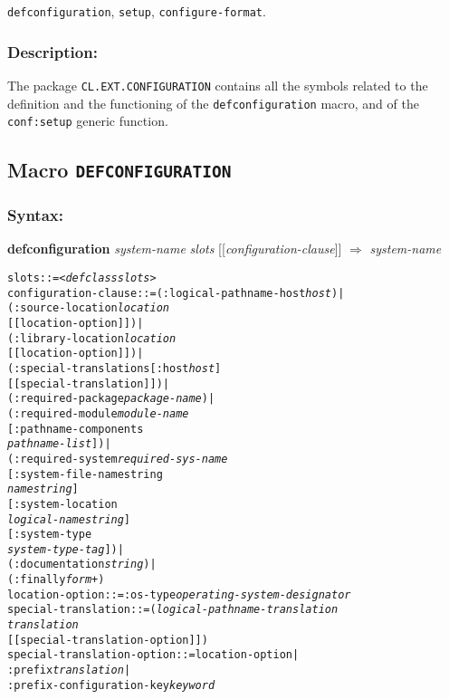 \documentclass[a4paper]{article}
\newcommand{\DEFCONFIGURATION}{\texttt{DEFCONFIGURATION}}
\newcommand{\defconfiguration}{\texttt{defconfiguration}}
\newcommand{\code}[1]{\texttt{#1}}
\begin{document}
\code{defconfiguration}, \code{setup}, \code{configure-format}.

\subsubsection*{Description:}

The package \code{CL.EXT.CONFIGURATION} contains all the symbols
related to the definition and the functioning of the
\defconfiguration{} macro, and of the \code{conf:setup} generic
function.

\subsection*{Macro \DEFCONFIGURATION{}}

\subsubsection*{Syntax:}

\textbf{defconfiguration} \emph{system-name} \emph{slots}
[[\emph{configuration-clause}]] $\Rightarrow$ \emph{system-name}

\begin{alltt}
slots ::= \emph{<defclass slots>}
configuration-clause ::= (:logical-pathname-host \emph{host}) |
                         (:source-location \emph{location}
                                           [[location-option]]) |
                         (:library-location \emph{location}
                                            [[location-option]]) |
                         (:special-translations [:host \emph{host}]
                                                [[special-translation]]) |
                         (:required-package \emph{package-name}) |
                         (:required-module \emph{module-name}
                                           [:pathname-components
                                            \emph{pathname-list}]) |
                         (:required-system \emph{required-sys-name}
                                           [:system-file-namestring
                                            \emph{namestring}]
                                           [:system-location
                                            \emph{logical-namestring}]
                                           [:system-type
                                            \emph{system-type-tag}]) |
                         (:documentation \emph{string}) |
                         (:finally \emph{form}+)
location-option ::= :os-type \emph{operating-system-designator}
special-translation ::= (\emph{logical-pathname-translation}
                         \emph{translation}
                         [[special-translation-option]])
special-translation-option ::= location-option |
                               :prefix \emph{translation} |
                               :prefix-configuration-key \emph{keyword}
\end{alltt}
\end{document}

